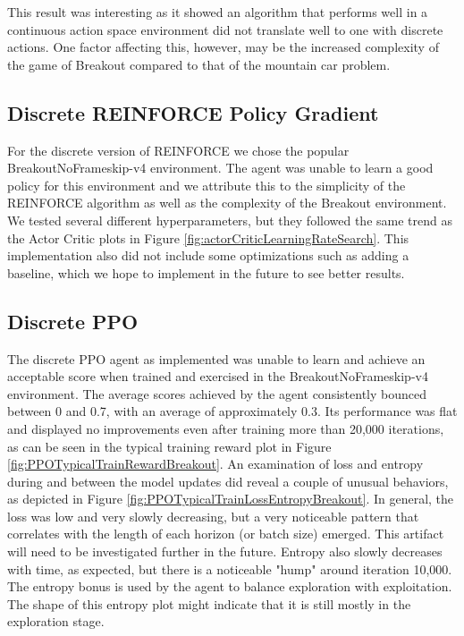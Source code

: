 \documentclass[conference]{IEEEtran}
\begin{document}
This result was interesting as it showed an algorithm that performs well in a continuous action space environment did not translate well to one with discrete actions.
One factor affecting this, however, may be the increased complexity of the game of Breakout compared to that of the mountain car problem.

\subsection{Discrete REINFORCE Policy Gradient}
For the discrete version of REINFORCE we chose the popular BreakoutNoFrameskip-v4 environment. The agent was unable to learn a good policy for this environment and we attribute this to the simplicity of the REINFORCE algorithm as well as the complexity of the Breakout environment. We tested several different hyperparameters, but they followed the same trend as the Actor Critic plots in Figure \ref{fig:actorCriticLearningRateSearch}.
This implementation also did not include some optimizations such as adding a baseline, which we hope to implement in the future to see better results.

\subsection{Discrete PPO}
The discrete PPO agent as implemented was unable to learn and achieve an acceptable score when trained and exercised in the BreakoutNoFrameskip-v4 environment. The average scores achieved by the agent consistently bounced between 0 and 0.7, with an average of approximately 0.3. Its performance was flat and displayed no improvements even after training more than 20,000 iterations, as can be seen in the typical training reward plot in Figure \ref{fig:PPOTypicalTrainRewardBreakout}. An examination of loss and entropy during and between the model updates did reveal a couple of unusual behaviors, as depicted in Figure \ref{fig:PPOTypicalTrainLossEntropyBreakout}. In general, the loss was low and very slowly decreasing, but a very noticeable pattern that correlates with the length of each horizon (or batch size) emerged. This artifact will need to be investigated further in the future. Entropy also slowly decreases with time, as expected, but there is a noticeable "hump" around iteration 10,000. The entropy bonus is used by the agent to balance exploration with exploitation. The shape of this entropy plot might indicate that it is still mostly in the exploration stage.
\end{document}

